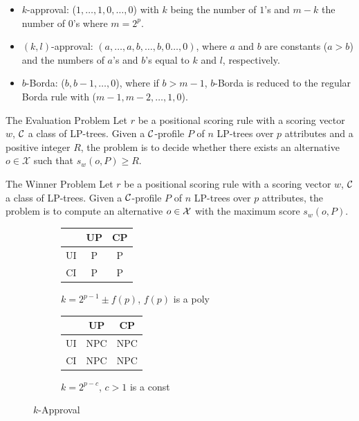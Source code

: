 {
	\begin{itemize}
		\item $k$-approval: ($1,\ldots,1,0,\ldots,0$) with $k$ being the number
					of $1$'s and $m-k$ the number of $0$'s where $m=2^p$.
		\item $(k,l)$-approval: $(a,\ldots, a, b,\ldots, b, 0\ldots, 0)$,
		      where $a$ and $b$ are constants ($a>b$)
					and the numbers of $a$'s and $b$'s equal to $k$ and $l$,
      		respectively.
		\item $b$-Borda: ($b, b-1, \ldots, 0$), where if $b > m-1$, $b$-Borda is reduced to the regular
							Borda rule with ($m-1, m-2, \ldots, 1, 0$).
	\end{itemize}
}

{
  \begin{block}{The Evaluation Problem}
		Let $r$ be a positional scoring rule with a scoring 
		vector $w$, $\mathcal{C}$ a class of LP-trees.
		Given a $\mathcal{C}$-profile $P$ of $n$ LP-trees over $p$ attributes and a 
		positive integer $R$,
		the  problem is to decide whether 
		there exists an alternative $o \in \mathcal{X}$ such that $s_{{w}}(o,P)
    \geq R$.
  \end{block}

	\vspace{0.5cm}

  \begin{block}{The Winner Problem}
		Let $r$ be a positional scoring rule with a scoring 
		vector $w$, $\mathcal{C}$ a class of LP-trees.
		Given a $\mathcal{C}$-profile $P$ of $n$ LP-trees over $p$ attributes,
		the  problem is to compute an alternative
		$o \in \mathcal{X}$ with the maximum score $s_w(o,P)$.
  \end{block}
}

{
	\begin{figure}
		\centering
    \begin{subfigure}[b]{0.45\textwidth}
			\centering
		  \begin{tabular}[0.45\textwidth]{ | c | c | c | }
		    \hline
		      & UP & CP \\
		    \hline
		    UI & P & P \\
		    \hline
		    CI & P & P \\
		    \hline
		  \end{tabular}
			\caption{\footnotesize $k=2^{p-1} \pm f(p)$, $f(p)$ is a poly}
		\end{subfigure}
    \begin{subfigure}[b]{0.45\textwidth}
			\centering
		  \begin{tabular}[0.45\textwidth]{ | c | c | c | }
		    \hline
		      & UP & CP \\
		    \hline
		    UI & NPC & NPC \\
		    \hline
		    CI & NPC & NPC \\
		    \hline
		  \end{tabular}
			\caption{\footnotesize $k=2^{p-c}$, $c>1$ is a const}
		\end{subfigure}
		\caption{$k$-Approval}
	\end{figure}
}

